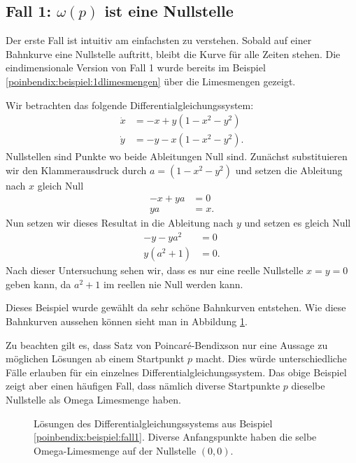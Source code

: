 \subsection{Fall 1: $\omega(p)$ ist eine Nullstelle} \label{poinbendix:subsection:fall1}

Der erste Fall ist intuitiv am einfachsten zu verstehen.
Sobald auf einer Bahnkurve eine Nullstelle auftritt, bleibt die Kurve für alle Zeiten stehen.
Die eindimensionale Version von Fall 1  wurde bereits im Beispiel \ref{poinbendix:beispiel:1dlimesmengen} über die Limesmengen gezeigt.

\begin{beispiel} \label{poinbendix:beispiel:fall1}
Wir betrachten das folgende Differentialgleichungssystem:
\begin{align*}
    \dot{x} &= -x + y(1-x^2-y^2) \\
    \dot{y} &= -y - x(1-x^2-y^2).
\end{align*}
Nullstellen sind Punkte wo beide Ableitungen Null sind.
Zunächst substituieren wir den Klammerausdruck durch $a = (1-x^2-y^2)$ und setzen die Ableitung nach $x$ gleich Null
\begin{align*}
    -x + ya &= 0 \\
    ya &= x.
\end{align*}
Nun setzen wir dieses Resultat in die Ableitung nach $y$ und setzen es gleich Null
\begin{align*}
    -y - ya^2 &= 0 \\
    y(a^2+1) &= 0.
\end{align*}
Nach dieser Untersuchung sehen wir, dass es nur eine reelle Nullstelle $x=y=0$ geben kann, da $a^2 + 1$ im reellen nie Null werden kann.

Dieses Beispiel wurde gewählt da sehr schöne Bahnkurven entstehen.
Wie diese Bahnkurven aussehen können sieht man in Abbildung \ref{poinbendix:fig:fixed_point_omega_set}.
\end{beispiel}

Zu beachten gilt es, dass Satz von Poincaré-Bendixson nur eine Aussage zu möglichen Lösungen ab einem Startpunkt $p$ macht.
Dies würde unterschiedliche Fälle erlauben für ein einzelnes Differentialgleichungssystem.
Das obige Beispiel zeigt aber einen häufigen Fall, dass nämlich diverse Startpunkte $p$ dieselbe Nullstelle als Omega Limesmenge haben.

\begin{figure}
    \centering
    
    \caption{Lösungen des Differentialgleichungssystems aus Beispiel \ref{poinbendix:beispiel:fall1}.
    Diverse Anfangspunkte haben die selbe Omega-Limesmenge auf der Nullstelle $(0,0)$.}
    \label{poinbendix:fig:fixed_point_omega_set}
\end{figure}

